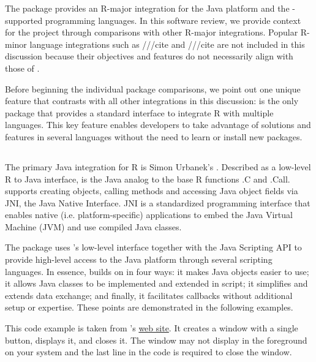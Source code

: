 The  package provides an R-major integration for the Java platform and the -supported programming languages. In this software review, we provide context for the  project through comparisons with other R-major integrations. Popular R-minor language integrations such as  ///cite and  ///cite are not included in this discussion because their objectives and features do not necessarily align with those of .

Before beginning the individual package comparisons, we point out one unique feature that contrasts  with all other integrations in this discussion:  is the only package that provides a standard interface to integrate R with multiple languages. This key feature enables developers to take advantage of solutions and features in several languages without the need to learn or install new packages.

\subsection{}

The primary Java integration for R is Simon Urbanek's . Described as a low-level R to Java interface,  is the Java analog to the base R functions .C and .Call.  supports creating objects, calling methods and accessing Java object fields via JNI, the Java Native Interface. JNI is a standardized programming interface that enables native (i.e. platform-specific) applications to embed the Java Virtual Machine (JVM) and use compiled Java classes.

The  package uses 's low-level interface together with the Java Scripting API to provide high-level access to the Java platform through several scripting languages. In essence,  builds on  in four ways: it makes Java objects easier to use; it allows Java classes to be implemented and extended in script; it simplifies and extends data exchange; and finally, it facilitates callbacks without additional setup or expertise. These points are demonstrated in the following examples.

This code example is taken from 's \href{http://www.rforge.net/rJava/}{web site}. It creates a window with a single button, displays it, and closes it.  The window may not display in the foreground on your system and the last line in the code is required to close the window.

